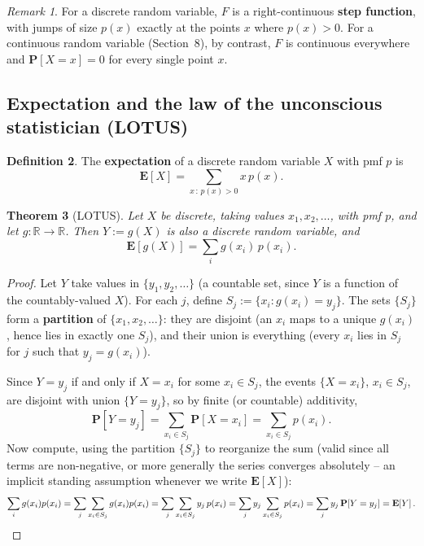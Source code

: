 \documentclass[11pt]{article}
\theoremstyle{definition}
\newtheorem{definition}{Definition}[section]
\theoremstyle{plain}
\newtheorem{theorem}[definition]{Theorem}
\theoremstyle{remark}
\newtheorem{remark}[definition]{Remark}
\newcommand{\E}[1]{\mathbf{E}\!\left[#1\right]}
\newcommand{\R}{\mathbb{R}}
\begin{document}
\begin{remark}
For a discrete random variable, $F$ is a right-continuous \textbf{step function}, with jumps of
size $p(x)$ exactly at the points $x$ where $p(x)>0$. For a continuous random variable (Section~8),
by contrast, $F$ is continuous everywhere and $\mathbf{P}[X=x]=0$ for every single point $x$.
\end{remark}

\subsection{Expectation and the law of the unconscious statistician (LOTUS)}

\begin{definition}
The \textbf{expectation} of a discrete random variable $X$ with pmf $p$ is
\[
\E{X} = \sum_{x\,:\,p(x)>0} x\,p(x).
\]
\end{definition}

\begin{theorem}[LOTUS]
\label{thm:lotus}
Let $X$ be discrete, taking values $x_1,x_2,\dots$, with pmf $p$, and let $g:\R\to\R$. Then
$Y := g(X)$ is also a discrete random variable, and
\[
\E{g(X)} = \sum_{i} g(x_i)\,p(x_i).
\]
\end{theorem}
\begin{proof}
Let $Y$ take values in $\{y_1,y_2,\dots\}$ (a countable set, since $Y$ is a function of the
countably-valued $X$). For each $j$, define $S_j := \{x_i : g(x_i)=y_j\}$. The sets $\{S_j\}$ form
a \textbf{partition} of $\{x_1,x_2,\dots\}$: they are disjoint (an $x_i$ maps to a unique $g(x_i)$,
hence lies in exactly one $S_j$), and their union is everything (every $x_i$ lies in $S_j$ for
$j$ such that $y_j = g(x_i)$).

Since $Y=y_j$ if and only if $X=x_i$ for some $x_i \in S_j$, the events $\{X=x_i\}$, $x_i \in S_j$,
are disjoint with union $\{Y=y_j\}$, so by finite (or countable) additivity,
\[
\mathbf{P}[Y=y_j] = \sum_{x_i \in S_j} \mathbf{P}[X=x_i] = \sum_{x_i\in S_j}p(x_i).
\]
Now compute, using the partition $\{S_j\}$ to reorganize the sum (valid since all terms are
non-negative, or more generally the series converges absolutely -- an implicit standing
assumption whenever we write $\E{X}$):
\[
\sum_i g(x_i)p(x_i) = \sum_j \sum_{x_i \in S_j} g(x_i)p(x_i)
= \sum_j \sum_{x_i\in S_j} y_j\, p(x_i)
= \sum_j y_j \sum_{x_i \in S_j}p(x_i) = \sum_j y_j\, \mathbf{P}[Y=y_j] = \E{Y}. \qedhere
\]
\end{proof}
\end{document}
